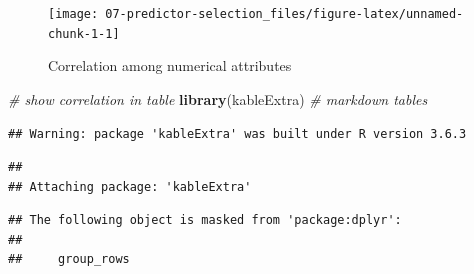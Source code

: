 \documentclass[
]{book}
\newenvironment{Shaded}{\begin{snugshade}}{\end{snugshade}}
\newcommand{\CommentTok}[1]{\textcolor[rgb]{0.56,0.35,0.01}{\textit{#1}}}
\newcommand{\DataTypeTok}[1]{\textcolor[rgb]{0.13,0.29,0.53}{#1}}
\newcommand{\DecValTok}[1]{\textcolor[rgb]{0.00,0.00,0.81}{#1}}
\newcommand{\KeywordTok}[1]{\textcolor[rgb]{0.13,0.29,0.53}{\textbf{#1}}}
\newcommand{\NormalTok}[1]{#1}
\newcommand{\OperatorTok}[1]{\textcolor[rgb]{0.81,0.36,0.00}{\textbf{#1}}}
\newcommand{\OtherTok}[1]{\textcolor[rgb]{0.56,0.35,0.01}{#1}}
\newcommand{\StringTok}[1]{\textcolor[rgb]{0.31,0.60,0.02}{#1}}
\begin{document}
\begin{figure}

{\centering \texttt{[image: 07-predictor-selection\_files/figure-latex/unnamed-chunk-1-1]} 

}

\caption{Correlation among numerical attributes}\label{fig:unnamed-chunk-1}
\end{figure}

\begin{Shaded}
\begin{Highlighting}[]
\CommentTok{# show correlation in table}
\KeywordTok{library}\NormalTok{(kableExtra) }\CommentTok{# markdown tables }
\end{Highlighting}
\end{Shaded}

\begin{verbatim}
## Warning: package 'kableExtra' was built under R version 3.6.3
\end{verbatim}

\begin{verbatim}
## 
## Attaching package: 'kableExtra'
\end{verbatim}

\begin{verbatim}
## The following object is masked from 'package:dplyr':
## 
##     group_rows
\end{verbatim}

\begin{Shaded}
\end{Shaded}
\end{document}

